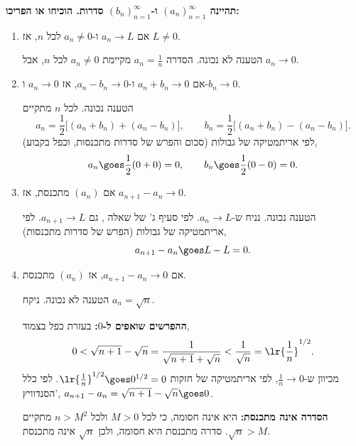\textbf{תהיינה
$(a_n)_{n=1}^{\infty}$
ו-$(b_n)_{n=1}^{\infty}$
סדרות.
הוכיחו או הפריכו:}
\begin{enumerate}
\item
אם
$a_n\to L$
ו-$a_n\ne0$
לכל
$n$,
אז
$L\ne0$.
\begin{solbox}
הטענה לא נכונה. הסדרה
$a_n=\frac1n$
מקיימת
$a_n\ne0$
לכל
$n$,
אבל
$a_n\to0$.
\end{solbox}

\item
אם
$a_n+b_n\to0$
ו-$a_n-b_n\to0$,
אז
$a_n\to0$
ו-$b_n\to0$.
\begin{solbox}
הטענה נכונה. לכל
$n$
מתקיים
$$a_n=\frac12\bigl[(a_n+b_n)+(a_n-b_n)\bigr],\qquad b_n=\frac12\bigl[(a_n+b_n)-(a_n-b_n)\bigr].$$
לפי אריתמטיקה של גבולות (סכום והפרש של סדרות מתכנסות, וכפל בקבוע),
$$a_n\goes\frac12(0+0)=0,\qquad b_n\goes\frac12(0-0)=0 .$$
\end{solbox}

\item
אם
$(a_n)$
מתכנסת, אז
$a_{n+1}-a_n\to0$.
\begin{solbox}
הטענה נכונה. נניח ש-$a_n\to L$.
לפי סעיף ג' של שאלה
,
גם
$a_{n+1}\to L$.
לפי אריתמטיקה של גבולות (הפרש של סדרות מתכנסות),
$$a_{n+1}-a_n\goes L-L=0 .$$
\end{solbox}

\item
אם
$a_{n+1}-a_n\to0$,
אז
$(a_n)$
מתכנסת.
\begin{solbox}
הטענה לא נכונה. ניקח
$a_n=\sqrt n$.

\textbf{ההפרשים שואפים ל-$0$:}
בעזרת כפל בצמוד,
$$0<\sqrt{n+1}-\sqrt n=\frac{1}{\sqrt{n+1}+\sqrt n}<\frac{1}{\sqrt n}=\lr{\frac1n}^{1/2}.$$
מכיוון ש-$\frac1n\to0$, לפי אריתמטיקה של חזקות
$\lr{\frac1n}^{1/2}\goes0^{1/2}=0$.
לפי כלל הסנדוויץ', $a_{n+1}-a_n=\sqrt{n+1}-\sqrt n\goes0$.

\textbf{הסדרה אינה מתכנסת:}
היא אינה חסומה, כי לכל
$M>0$
ולכל
$n>M^2$
מתקיים
$\sqrt n>M$.
סדרה מתכנסת היא חסומה, ולכן
$\sqrt n$
אינה מתכנסת.
\end{solbox}

\end{enumerate}
